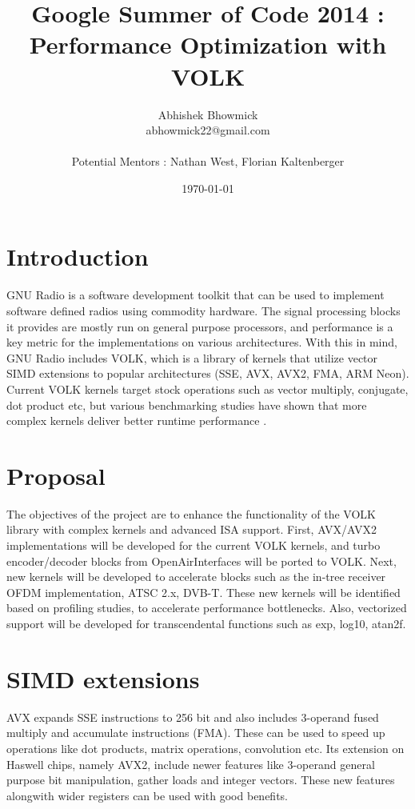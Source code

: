 \documentclass[a4paper,12pt,oneside]{article}
\title{Google Summer of Code 2014 : Performance Optimization with VOLK}
\date{\today}
\author{Abhishek Bhowmick\\ abhowmick22@gmail.com\\ \\Potential Mentors : Nathan West, Florian Kaltenberger}
\begin{document}
\maketitle
\tableofcontents
\newpage
\section{Introduction}
GNU Radio \cite{gnuradio} is a software development toolkit that can be used to implement software defined radios using commodity hardware. The signal processing blocks it provides are mostly run on general purpose processors, and performance is a key metric for the implementations on various architectures. With this in mind, GNU Radio includes VOLK, which is a library of kernels that utilize vector SIMD extensions to popular architectures (SSE, AVX, AVX2, FMA, ARM Neon). Current VOLK kernels target stock operations such as vector multiply, conjugate, dot product etc, but various benchmarking studies have shown that more complex kernels deliver better runtime performance \cite{volk-benchmark}.   

\section{Proposal}

The objectives of the project are to enhance the functionality of the VOLK library with complex kernels and advanced ISA support. First, AVX/AVX2 implementations will be developed for the current VOLK kernels, and turbo encoder/decoder blocks from OpenAirInterfaces \cite{openair} will be ported to VOLK. Next, new kernels will be developed to accelerate blocks such as the in-tree receiver OFDM implementation, ATSC 2.x, DVB-T. These new kernels will be identified based on profiling studies, to accelerate performance bottlenecks. Also, vectorized support will be developed for transcendental functions such as exp, log10, atan2f.

\section{SIMD extensions}

AVX expands SSE instructions to 256 bit and also includes 3-operand fused multiply and accumulate instructions (FMA). These can be used to speed up operations like dot products, matrix operations, convolution etc. Its extension on Haswell chips, namely AVX2, include newer features like 3-operand general purpose bit manipulation, gather loads and integer vectors. These new features alongwith wider registers can be used with good benefits. 
\end{document}
